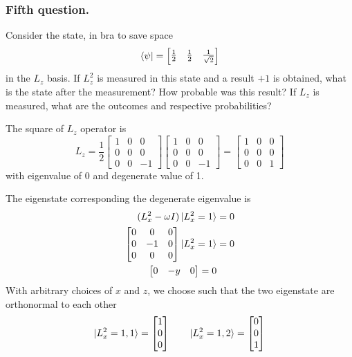 \documentclass[../../../main.tex]{subfiles}
\begin{document}
\subsubsection{Fifth question.}
Consider the state, in bra to save space
\begin{equation*}
    \bra{\psi}=\begin{bmatrix}
        \frac{1 }{2} & \frac{1 }{2} & \frac{1 }{\sqrt{2}}
    \end{bmatrix}
\end{equation*}
in the $L_z$ basis.
If $L_z^2$ is measured in this state and a result $+1$ is obtained, what is the state after the measurement?
How probable was this result?
If $L_z$ is measured, what are the outcomes and respective probabilities?

The square of $L_z$ operator is
\begin{equation*}
    L_z=\frac{1 }{2}
    \begin{bmatrix}
        1 & 0 & 0  \\
        0 & 0 & 0  \\
        0 & 0 & -1
    \end{bmatrix}
    \begin{bmatrix}
        1 & 0 & 0  \\
        0 & 0 & 0  \\
        0 & 0 & -1
    \end{bmatrix}
    =
    \begin{bmatrix}
        1 & 0 & 0 \\
        0 & 0 & 0 \\
        0 & 0 & 1
    \end{bmatrix}
\end{equation*}
with eigenvalue of 0 and degenerate value of 1.

The eigenstate corresponding the degenerate eigenvalue is 
\begin{align*}
    (L_x^2-\omega I)\ket{L_x^2=1} &= 0\\
    \begin{bmatrix}
        0 & 0 & 0 \\
        0 & -1 & 0 \\
        0 & 0 & 0
    \end{bmatrix}
    \ket{L_x^2=1}&= 0\\
    \begin{bmatrix}
        0&-y&0
    \end{bmatrix}
    =0
\end{align*}
With arbitrary choices of $x$ and $z$, we choose such that the two eigenstate are orthonormal to each other
\begin{equation*}
    \ket{L_x^2=1,1}=
    \begin{bmatrix}
        1\\0\\0
    \end{bmatrix}\qquad
    \ket{L_x^2=1,2}=
    \begin{bmatrix}
        0\\0\\1
    \end{bmatrix}
\end{equation*}
\end{document}
